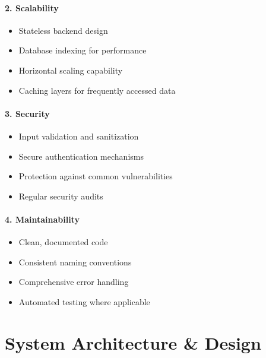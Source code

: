 \documentclass[12pt,a4paper]{report}
\begin{document}
\subsubsection*{2. Scalability}
\begin{itemize}
    \item Stateless backend design
    \item Database indexing for performance
    \item Horizontal scaling capability
    \item Caching layers for frequently accessed data
\end{itemize}

\subsubsection*{3. Security}
\begin{itemize}
    \item Input validation and sanitization
    \item Secure authentication mechanisms
    \item Protection against common vulnerabilities
    \item Regular security audits
\end{itemize}

\subsubsection*{4. Maintainability}
\begin{itemize}
    \item Clean, documented code
    \item Consistent naming conventions
    \item Comprehensive error handling
    \item Automated testing where applicable
\end{itemize}




\chapter{System Architecture \& Design}
\end{document}
